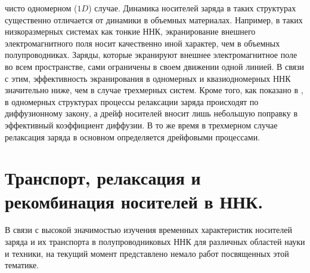 \documentclass[a4paper,14pt,russian]{extreport}
\begin{document}
чисто одномерном ($1D$) случае. Динамика носителей заряда в таких структурах существенно отличается от динамики в объемных материалах. Например, в таких низкоразмерных системах как тонкие ННК, экранирование внешнего электромагнитного поля носит качественно иной характер, чем в объемных полупроводниках. Заряды, которые экранируют внешнее электромагнитное поле во всем пространстве, сами ограничены в своем движении одной линией. В связи с этим, эффективность экранирования в одномерных и квазиодномерных ННК значительно ниже, чем в случае трехмерных систем. Кроме того, как показано в \cite{SiliconNWContactPhenomena}, в одномерных структурах процессы релаксации заряда происходят по диффузионному закону, а дрейф носителей вносит лишь небольшую поправку в эффективный коэффициент диффузии. В то же время в трехмерном случае релаксация заряда в основном определяется дрейфовыми процессами.\par

		\section{Транспорт, релаксация и рекомбинация носителей в ННК.}
			В связи с высокой значимостью изучения временных характеристик носителей заряда и их транспорта в полупроводниковых ННК для различных областей науки и техники, на текущий момент представлено немало работ посвященных этой тематике.
\end{document}
